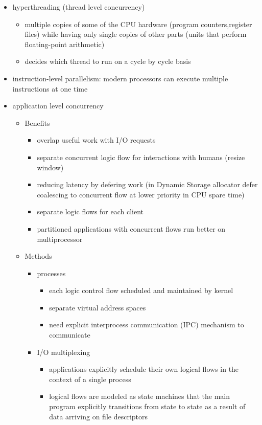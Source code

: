 \documentclass[11pt]{article}
\begin{document}
\begin{itemize}
  \item hyperthreading (thread level concurrency)
  \begin{itemize}
    \item multiple copies of some of the CPU hardware (program counters,register files) while having only single copies of other parts (units that perform floating-point arithmetic)
    \item decides which thread to run on a cycle by cycle basis
  \end{itemize}
  \item instruction-level parallelism: modern processors can execute multiple instructions at one time
  \item application level concurrency
  \begin{itemize}
    \item Benefits
    \begin{itemize}
      \item overlap useful work with I/O requests
      \item separate concurrent logic flow for interactions with humans (resize window)
      \item reducing latency by defering work (in Dynamic Storage allocator defer coalescing to concurrent flow at lower priority in CPU spare time)
      \item separate logic flows for each client
      \item partitioned applications with concurrent flows run better on multiprocessor
    \end{itemize}
    \item Methods
    \begin{itemize}
      \item processes
      \begin{itemize}
        \item each logic control flow scheduled and maintained by kernel
        \item separate virtual address spaces
        \item need explicit interprocess communication (IPC) mechanism to communicate
      \end{itemize}
      \item I/O multiplexing
      \begin{itemize}
        \item applications explicitly schedule their own logical flows in the context of a single process
        \item logical flows are modeled as state machines that the main program explicitly transitions from state to state as a result of data arriving on file descriptors

\end{itemize}
\end{itemize}
\end{itemize}
\end{itemize}
\end{document}

